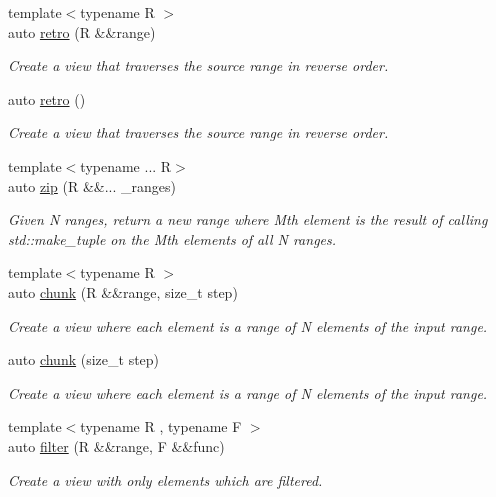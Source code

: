 \begin{DoxyCompactItemize}
{\footnotesize template$<$typename R $>$ }\\auto \mbox{\hyperlink{namespacerah_1_1view_a9f47b2859b0a8a7e136f09d5c33b89e6}{retro}} (R \&\&range)
\begin{DoxyCompactList}\small\item\em Create a view that traverses the source range in reverse order. \end{DoxyCompactList}\item 
auto \mbox{\hyperlink{namespacerah_1_1view_a8cafe11e62b8f98833a9172cc803f116}{retro}} ()
\begin{DoxyCompactList}\small\item\em Create a view that traverses the source range in reverse order. \end{DoxyCompactList}\item 
{\footnotesize template$<$typename ... R$>$ }\\auto \mbox{\hyperlink{namespacerah_1_1view_a5b9cacbf101962d95221b591d7f11026}{zip}} (R \&\&... \+\_\+ranges)
\begin{DoxyCompactList}\small\item\em Given N ranges, return a new range where Mth element is the result of calling std\+::make\+\_\+tuple on the Mth elements of all N ranges. \end{DoxyCompactList}\item 
{\footnotesize template$<$typename R $>$ }\\auto \mbox{\hyperlink{namespacerah_1_1view_a2859e5c6e21d7a2bf9e188539602daa7}{chunk}} (R \&\&range, size\+\_\+t step)
\begin{DoxyCompactList}\small\item\em Create a view where each element is a range of N elements of the input range. \end{DoxyCompactList}\item 
auto \mbox{\hyperlink{namespacerah_1_1view_a5b3a70ad1a0373e8fadbfa26a9676077}{chunk}} (size\+\_\+t step)
\begin{DoxyCompactList}\small\item\em Create a view where each element is a range of N elements of the input range. \end{DoxyCompactList}\item 
{\footnotesize template$<$typename R , typename F $>$ }\\auto \mbox{\hyperlink{namespacerah_1_1view_a69010369aadc2a36ee9517195f783e9a}{filter}} (R \&\&range, F \&\&func)
\begin{DoxyCompactList}\small\item\em Create a view with only elements which are filtered. \end{DoxyCompactList}\item 

\end{DoxyCompactItemize}
